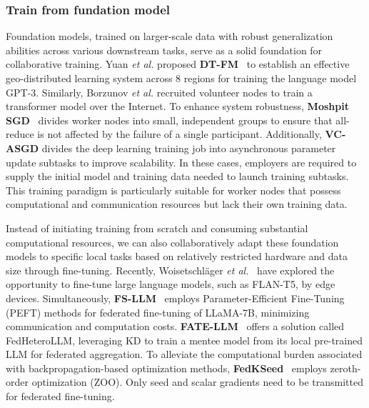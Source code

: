 \subsubsection{Train from fundation model}
Foundation models, trained on larger-scale data with robust generalization abilities across various downstream tasks, serve as a solid foundation for collaborative training. 
Yuan \textit{et al.} proposed \textbf{DT-FM}~\cite{yuan2022decentralized} to establish an effective geo-distributed learning system across 8 regions for training the language model GPT-3.
Similarly, Borzunov \textit{et al.}\cite{borzunov2022training} recruited volunteer nodes to train a transformer model over the Internet. 
To enhance system robustness, \textbf{Moshpit SGD}~\cite{ryabinin2021moshpit} divides worker nodes into small, independent groups to ensure that all-reduce is not affected by the failure of a single participant.
Additionally, \textbf{VC-ASGD}\cite{atre2021distributed} divides the deep learning training job into asynchronous parameter update subtasks to improve scalability.
In these cases, employers are required to supply the initial model and training data needed to launch training subtasks. 
This training paradigm is particularly suitable for worker nodes that possess computational and communication resources but lack their own training data.

Instead of initiating training from scratch and consuming substantial computational resources, we can also collaboratively adapt these foundation models to specific local tasks based on relatively restricted hardware and data size through fine-tuning.
Recently, Woisetschl{\"a}ger \textit{et al.}~\cite{woisetschlager2023federated} have explored the opportunity to fine-tune large language models, such as FLAN-T5, by edge devices.
Simultaneously, \textbf{FS-LLM}~\cite{kuang2023federatedscope} employs Parameter-Efficient Fine-Tuning (PEFT) methods for federated fine-tuning of LLaMA-7B, minimizing communication and computation costs.
\textbf{FATE-LLM}~\cite{fan2023fate} offers a solution called FedHeteroLLM, leveraging KD to train a mentee model from its local pre-trained LLM for federated aggregation.
To alleviate the computational burden associated with backpropagation-based optimization methods, \textbf{FedKSeed}~\cite{qin2023federated} employs zeroth-order optimization (ZOO). 
Only seed and scalar gradients need to be transmitted for federated fine-tuning.

